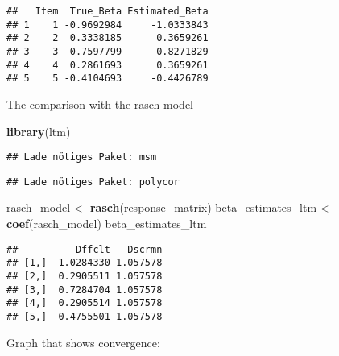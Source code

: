 \documentclass[
]{article}
\newenvironment{Shaded}{\begin{snugshade}}{\end{snugshade}}
\newcommand{\FunctionTok}[1]{\textcolor[rgb]{0.13,0.29,0.53}{\textbf{#1}}}
\newcommand{\NormalTok}[1]{#1}
\newcommand{\OtherTok}[1]{\textcolor[rgb]{0.56,0.35,0.01}{#1}}
\begin{document}
\begin{verbatim}
##   Item  True_Beta Estimated_Beta
## 1    1 -0.9692984     -1.0333843
## 2    2  0.3338185      0.3659261
## 3    3  0.7597799      0.8271829
## 4    4  0.2861693      0.3659261
## 5    5 -0.4104693     -0.4426789
\end{verbatim}

The comparison with the rasch model

\begin{Shaded}
\begin{Highlighting}[]
\FunctionTok{library}\NormalTok{(ltm)}
\end{Highlighting}
\end{Shaded}

\begin{verbatim}
## Lade nötiges Paket: msm
\end{verbatim}

\begin{verbatim}
## Lade nötiges Paket: polycor
\end{verbatim}

\begin{Shaded}
\begin{Highlighting}[]
\NormalTok{rasch\_model }\OtherTok{\textless{}{-}} \FunctionTok{rasch}\NormalTok{(response\_matrix)}
\NormalTok{beta\_estimates\_ltm }\OtherTok{\textless{}{-}} \FunctionTok{coef}\NormalTok{(rasch\_model)}
\NormalTok{beta\_estimates\_ltm}
\end{Highlighting}
\end{Shaded}

\begin{verbatim}
##          Dffclt   Dscrmn
## [1,] -1.0284330 1.057578
## [2,]  0.2905511 1.057578
## [3,]  0.7284704 1.057578
## [4,]  0.2905514 1.057578
## [5,] -0.4755501 1.057578
\end{verbatim}

Graph that shows convergence:
\end{document}
